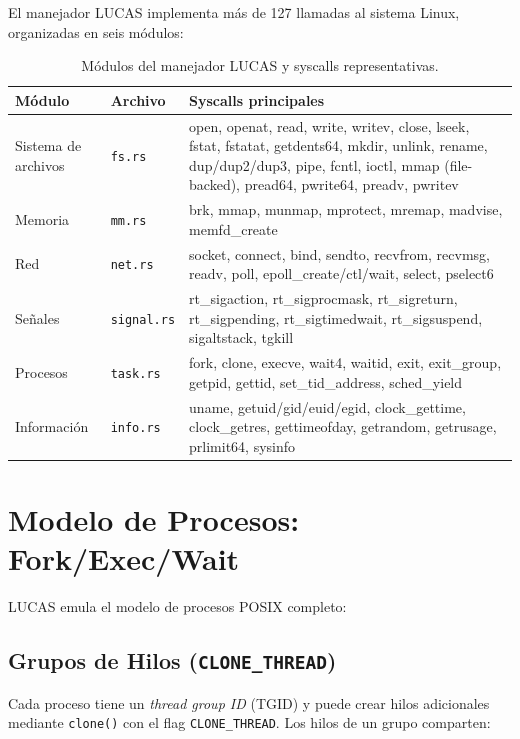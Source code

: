 \documentclass[11pt,twoside,openright]{book}
\theoremstyle{definition}
\theoremstyle{plain}
\theoremstyle{remark}
\begin{document}
El manejador LUCAS implementa más de 127 llamadas al sistema Linux, organizadas
en seis módulos:

\begin{table}[ht]
\centering
\caption{Módulos del manejador LUCAS y syscalls representativas.}
\label{tab:lucas-modules}
\begin{tabular}{@{}llp{7cm}@{}}
\toprule
\textbf{Módulo} & \textbf{Archivo} & \textbf{Syscalls principales} \\
\midrule
Sistema de archivos & \texttt{fs.rs} & open, openat, read, write, writev, close,
    lseek, fstat, fstatat, getdents64, mkdir, unlink, rename, dup/dup2/dup3, pipe,
    fcntl, ioctl, mmap (file-backed), pread64, pwrite64, preadv, pwritev \\
Memoria & \texttt{mm.rs} & brk, mmap, munmap, mprotect, mremap, madvise, memfd\_create \\
Red & \texttt{net.rs} & socket, connect, bind, sendto, recvfrom, recvmsg, readv,
    poll, epoll\_create/ctl/wait, select, pselect6 \\
Señales & \texttt{signal.rs} & rt\_sigaction, rt\_sigprocmask, rt\_sigreturn,
    rt\_sigpending, rt\_sigtimedwait, rt\_sigsuspend, sigaltstack, tgkill \\
Procesos & \texttt{task.rs} & fork, clone, execve, wait4, waitid, exit, exit\_group,
    getpid, gettid, set\_tid\_address, sched\_yield \\
Información & \texttt{info.rs} & uname, getuid/gid/euid/egid, clock\_gettime,
    clock\_getres, gettimeofday, getrandom, getrusage, prlimit64, sysinfo \\
\bottomrule
\end{tabular}
\end{table}

\section{Modelo de Procesos: Fork/Exec/Wait}
\label{sec:lucas-process}

LUCAS emula el modelo de procesos POSIX completo:

\subsection{Grupos de Hilos (\texttt{CLONE\_THREAD})}

Cada proceso tiene un \emph{thread group ID} (TGID) y puede crear hilos
adicionales mediante \texttt{clone()} con el flag \texttt{CLONE\_THREAD}.
Los hilos de un grupo comparten:
\end{document}
